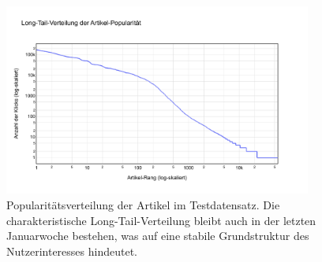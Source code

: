 
\begin{figure}[htbp]
    \centering
    \includegraphics[width=0.9\textwidth]{content/figures/svg/artikel_verteilung_test.pdf}
    \caption{Popularitätsverteilung der Artikel im Testdatensatz. Die charakteristische Long-Tail-Verteilung bleibt auch in der letzten Januarwoche bestehen, was auf eine stabile Grundstruktur des Nutzerinteresses hindeutet.}
    \label{fig:artikelverteilung_test}
\end{figure}